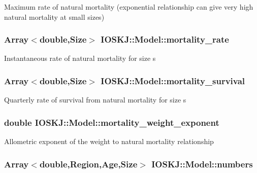 Maximum rate of natural mortality (exponential relationship can give very high natural mortality at small sizes) \hypertarget{classIOSKJ_1_1Model_a7fd43f29a1f093bfc97c0d6a8bd2a4ea}{
\subsubsection[{mortality\-\_\-rate}]{\setlength{\rightskip}{0pt plus 5cm}Array$<$double,Size$>$ I\-O\-S\-K\-J\-::\-Model\-::mortality\-\_\-rate}}\label{classIOSKJ_1_1Model_a7fd43f29a1f093bfc97c0d6a8bd2a4ea}
Instantaneous rate of natural mortality for size s \hypertarget{classIOSKJ_1_1Model_ad3c9235716a5015c822d74610b4807ef}{
\subsubsection[{mortality\-\_\-survival}]{\setlength{\rightskip}{0pt plus 5cm}Array$<$double,Size$>$ I\-O\-S\-K\-J\-::\-Model\-::mortality\-\_\-survival}}\label{classIOSKJ_1_1Model_ad3c9235716a5015c822d74610b4807ef}
Quarterly rate of survival from natural mortality for size s \hypertarget{classIOSKJ_1_1Model_a6a3e26a7c2e42634669ea2526626a18e}{
\subsubsection[{mortality\-\_\-weight\-\_\-exponent}]{\setlength{\rightskip}{0pt plus 5cm}double I\-O\-S\-K\-J\-::\-Model\-::mortality\-\_\-weight\-\_\-exponent}}\label{classIOSKJ_1_1Model_a6a3e26a7c2e42634669ea2526626a18e}
Allometric exponent of the weight to natural mortality relationship \hypertarget{classIOSKJ_1_1Model_aa90edf75b7c9ebf8e50a30f3779b9664}{
\subsubsection[{numbers}]{\setlength{\rightskip}{0pt plus 5cm}Array$<$double,Region,Age,Size$>$ I\-O\-S\-K\-J\-::\-Model\-::numbers}}\label{classIOSKJ_1_1Model_aa90edf75b7c9ebf8e50a30f3779b9664}
